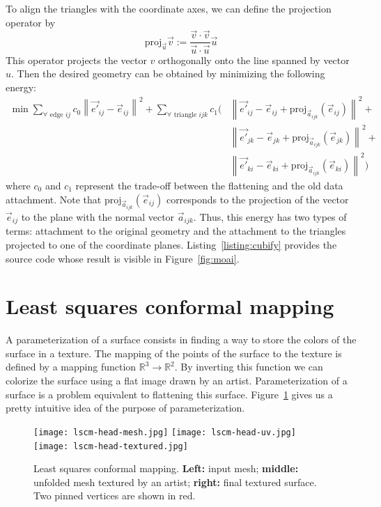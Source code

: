 \documentclass[notitlepage,oneside]{book}
\begin{document}
To align the triangles with the coordinate axes, we can define the projection operator by
$$
\text{proj}_{\vec{u}} \vec{v} := \frac{\vec{v}\cdot\vec{v}}{\vec{u}\cdot\vec{u}}\vec{u}
$$
This operator projects the vector $v$ orthogonally onto the line spanned by vector $u$.
Then the desired geometry can be obtained by minimizing the following energy:
\begin{align*}
\min \sum\limits_{\forall \text{~edge~} ij}c_0\left\|\vec{e'}_{ij} - \vec{e}_{ij}\right\|^2 +
\sum\limits_{\forall \text{~triangle~} ijk}c_1\biggl(& \left\|\vec{e'}_{ij} - \vec{e}_{ij} + \text{proj}_{\vec{a}_{ijk}} \left( \vec{e}_{ij}\right) \right\|^2 +\\
&\left\|\vec{e'}_{jk} - \vec{e}_{jk} + \text{proj}_{\vec{a}_{ijk}} \left( \vec{e}_{jk}\right) \right\|^2 +\\
&\left\|\vec{e'}_{ki} - \vec{e}_{ki} + \text{proj}_{\vec{a}_{ijk}} \left( \vec{e}_{ki}\right) \right\|^2\biggr)
\end{align*}
where $c_0$ and $c_1$ represent the trade-off between the flattening and the old data attachment.
Note that $\text{proj}_{\vec{a}_{ijk}} \left( \vec{e}_{ij}\right)$ corresponds to the projection of the vector $\vec{e}_{ij}$ to the plane with the normal vector $\vec{a}_{ijk}$.
Thus, this energy has two types of terms: attachment to the original geometry and the attachment to the triangles projected to one of the coordinate planes.
Listing~\ref{listing:cubify} provides the source code whose result is visible in Figure~\ref{fig:moai}.

\newpage
\section{Least squares conformal mapping}
\label{sec:lscm}
A parameterization of a surface consists in finding a way to store the colors of the surface in a texture.
The mapping of the points of the surface to the texture is defined by a mapping function $\mathbb R^3 \rightarrow \mathbb R^2$.
By inverting this function we can colorize the surface using a flat image drawn by an artist.
Parameterization of a surface is a problem equivalent to flattening this surface.
Figure~\ref{fig:lscm} gives us a pretty intuitive idea of the purpose of parameterization.

\begin{figure}[!h]
	\centering
    \texttt{[image: lscm-head-mesh.jpg]}
    \quad
    \texttt{[image: lscm-head-uv.jpg]}
    \quad
    \texttt{[image: lscm-head-textured.jpg]}
	\caption{Least squares conformal mapping. \textbf{Left:} input mesh; \textbf{middle:} unfolded mesh textured by an artist; \textbf{right:} final textured surface. Two pinned vertices are shown in red.}
	\label{fig:lscm}
\end{figure}
\end{document}

